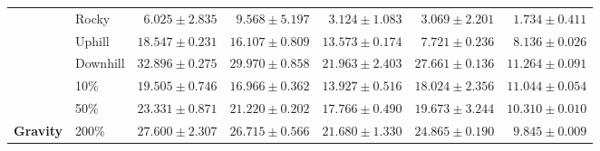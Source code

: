 \begin{table}[t]
{\begin{tabular}{|llrrrrr|}
            \rowcolor[HTML]{D3D3D3}
            \cellcolor[HTML]{D3D3D3}                                   & Rocky           & \multicolumn{1}{r|}{\cellcolor[HTML]{D3D3D3}$\mathit{6.025\pm2.835}$}  & \multicolumn{1}{r|}{\cellcolor[HTML]{D3D3D3}$\mathbf{9.568\pm5.197}$}  & \multicolumn{1}{r|}{\cellcolor[HTML]{D3D3D3}$3.124\pm1.083$}           & \multicolumn{1}{r|}{\cellcolor[HTML]{D3D3D3}$3.069\pm2.201$}     & $1.734\pm0.411$ \\
            \rowcolor[HTML]{D3D3D3}
            \cellcolor[HTML]{D3D3D3}                                   & Uphill          & \multicolumn{1}{r|}{\cellcolor[HTML]{D3D3D3}$\mathbf{18.547\pm0.231}$} & \multicolumn{1}{r|}{\cellcolor[HTML]{D3D3D3}$\mathit{16.107\pm0.809}$} & \multicolumn{1}{r|}{\cellcolor[HTML]{D3D3D3}$13.573\pm0.174$}          & \multicolumn{1}{r|}{\cellcolor[HTML]{D3D3D3}$7.721\pm0.236$}     & $8.136\pm0.026$ \\
            \rowcolor[HTML]{D3D3D3}
            \multirow{-3}{*}{\cellcolor[HTML]{D3D3D3}\textbf{Terrain}} & Downhill        & \multicolumn{1}{r|}{\cellcolor[HTML]{D3D3D3}$\mathbf{32.896\pm0.275}$} & \multicolumn{1}{r|}{\cellcolor[HTML]{D3D3D3}$\mathit{29.970\pm0.858}$} & \multicolumn{1}{r|}{\cellcolor[HTML]{D3D3D3}$21.963\pm2.403$}          & \multicolumn{1}{r|}{\cellcolor[HTML]{D3D3D3}$27.661\pm0.136$}    & $11.264\pm0.091$ \\
                                                                       & 10\%            & \multicolumn{1}{r|}{$\mathbf{19.505\pm0.746}$}                         & \multicolumn{1}{r|}{$16.966\pm0.362$}                                  & \multicolumn{1}{r|}{$13.927\pm0.516$}                                  & \multicolumn{1}{r|}{$\mathit{18.024\pm2.356}$}                   & $11.044\pm0.054$ \\
                                                                       & 50\%            & \multicolumn{1}{r|}{$\mathbf{23.331\pm0.871}$}                         & \multicolumn{1}{r|}{$\mathit{21.220\pm0.202}$}                         & \multicolumn{1}{r|}{$17.766\pm0.490$}                                  & \multicolumn{1}{r|}{$19.673\pm3.244$}                            & $10.310\pm0.010$ \\
            \multirow{-3}{*}{\textbf{Gravity}}                         & 200\%           & \multicolumn{1}{r|}{$\mathbf{27.600\pm2.307}$}                         & \multicolumn{1}{r|}{$\mathit{26.715\pm0.566}$}                         & \multicolumn{1}{r|}{$21.680\pm1.330$}                                  & \multicolumn{1}{r|}{$24.865\pm0.190$}                            & $9.845\pm0.009$ \\

\end{tabular}}
\end{table}
